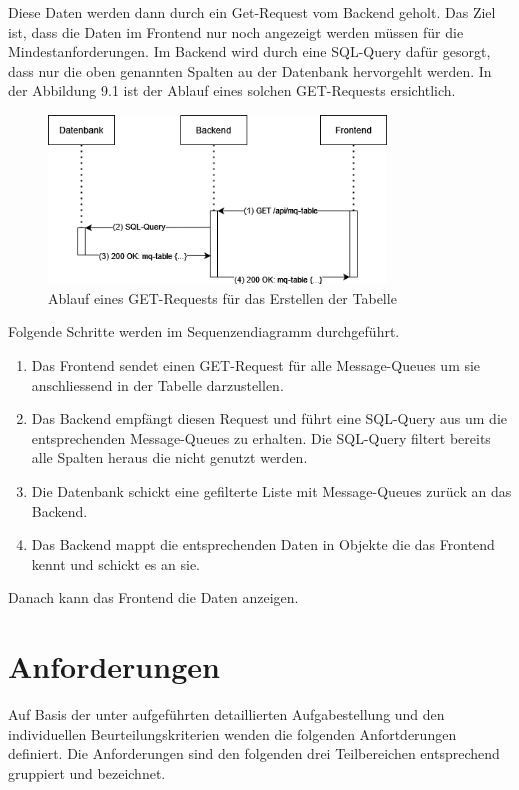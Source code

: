 \newpage
Diese Daten werden dann durch ein Get-Request vom Backend geholt. Das Ziel ist, dass die Daten im Frontend nur noch angezeigt werden müssen für die Mindestanforderungen. Im Backend wird durch eine SQL-Query dafür gesorgt, dass nur die oben genannten Spalten au der Datenbank hervorgehlt werden. In der Abbildung 9.1 ist der Ablauf eines solchen GET-Requests ersichtlich.

\begin{figure}[H]
	\begin{center}
		\includegraphics[width=0.8\textwidth]{ressourcen/Sequenzendiagramm}
		\caption[Ablauf eines GET-Requests für das Erstellen der Tabelle]{Ablauf eines GET-Requests für das Erstellen der Tabelle}\label{fig:get-request-for-creation-of-table}
	\end{center}
\end{figure}

Folgende Schritte werden im Sequenzendiagramm durchgeführt.
\begin{enumerate}
	\item Das Frontend sendet einen GET-Request für alle Message-Queues um sie anschliessend in der Tabelle darzustellen.
	\item Das Backend empfängt diesen Request und führt eine SQL-Query aus um die entsprechenden Message-Queues zu erhalten. Die SQL-Query filtert bereits alle Spalten heraus die nicht genutzt werden.
	\item Die Datenbank schickt eine gefilterte Liste mit Message-Queues zurück an das Backend.
	\item Das Backend mappt die entsprechenden Daten in Objekte die das Frontend kennt und schickt es an sie.
\end{enumerate}

Danach kann das Frontend die Daten anzeigen.
\newpage
\section{Anforderungen}
Auf Basis der unter  aufgeführten detaillierten Aufgabestellung und den individuellen Beurteilungskriterien wenden die folgenden Anfortderungen definiert. Die Anforderungen sind den folgenden drei Teilbereichen entsprechend gruppiert und bezeichnet.

